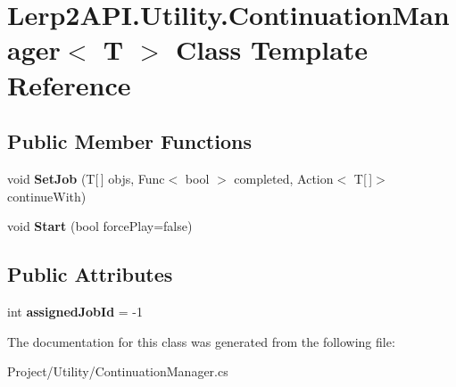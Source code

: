 \hypertarget{class_lerp2_a_p_i_1_1_utility_1_1_continuation_manager}{}\section{Lerp2\+A\+P\+I.\+Utility.\+Continuation\+Manager$<$ T $>$ Class Template Reference}
\label{class_lerp2_a_p_i_1_1_utility_1_1_continuation_manager}
\subsection*{Public Member Functions}
\begin{DoxyCompactItemize}
\item 
\mbox{\label{class_lerp2_a_p_i_1_1_utility_1_1_continuation_manager_a5ea664c9774b48456941b39f38bce7ce}} 
void {\bfseries Set\+Job} (T\mbox{[}$\,$\mbox{]} objs, Func$<$ bool $>$ completed, Action$<$ T\mbox{[}$\,$\mbox{]}$>$ continue\+With)
\item 
\mbox{\label{class_lerp2_a_p_i_1_1_utility_1_1_continuation_manager_a58af58722b7da1a8a3d7d285f6477149}} 
void {\bfseries Start} (bool force\+Play=false)
\end{DoxyCompactItemize}
\subsection*{Public Attributes}
\begin{DoxyCompactItemize}
\item 
\mbox{\label{class_lerp2_a_p_i_1_1_utility_1_1_continuation_manager_ad61df6f6506156539d46d550894fba06}} 
int {\bfseries assigned\+Job\+Id} = -\/1
\end{DoxyCompactItemize}


The documentation for this class was generated from the following file\+:\begin{DoxyCompactItemize}
\item 
Project/\+Utility/Continuation\+Manager.\+cs\end{DoxyCompactItemize}
